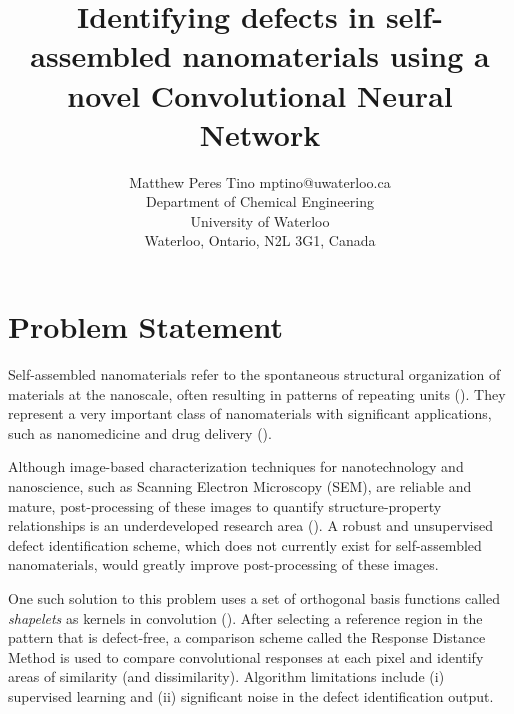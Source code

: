 \documentclass[twoside,11pt]{article}
\begin{document}
\title{Identifying defects in self-assembled nanomaterials using a novel Convolutional Neural Network}

\author{\name Matthew Peres Tino \email mptino@uwaterloo.ca \\
       \addr Department of Chemical Engineering\\
       University of Waterloo\\
       Waterloo, Ontario, N2L 3G1, Canada}


\maketitle




\section{Problem Statement}

Self-assembled nanomaterials refer to the spontaneous structural organization of materials at the nanoscale, often resulting in patterns of repeating units (\cite{Li2019, Amadi2022}).  They represent a very important class of nanomaterials with significant applications, such as nanomedicine and drug delivery (\cite{Amadi2022}). 

Although image-based characterization techniques for nanotechnology and nanoscience, such as Scanning Electron Microscopy (SEM), are reliable and mature, post-processing of these images to quantify structure-property relationships is an underdeveloped research area (\cite{Abukhdeir2016}). A robust and unsupervised defect identification scheme, which does not currently exist for self-assembled nanomaterials, would greatly improve post-processing of these images.

One such solution to this problem uses a set of orthogonal basis functions called \textit{shapelets} as kernels in convolution (\cite{rob, thomas}). After selecting a reference region in the pattern that is defect-free, a comparison scheme called the Response Distance Method is used to compare convolutional responses at each pixel and identify areas of similarity (and dissimilarity). Algorithm limitations include (i) supervised learning and (ii) significant noise in the defect identification output.
\end{document}
